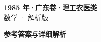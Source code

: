 \documentclass[zihao=-4, a4paper]{ctexart}
\begin{document}
\begin{center}
  {\Large\bfseries 1985 年·广东卷·理工农医类}\\[4pt]
  {\large 数学 · 解析版}
\end{center}
\medskip
{}

\clearpage
{}
\begin{center}{\Large\bfseries 参考答案与详细解析}\end{center}
\medskip

\end{document}
